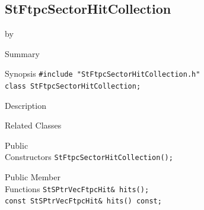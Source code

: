 \documentclass[twoside]{article}
\newcommand{\entrylabel}[1]{\mbox{\textbf{{#1}}}\hfil}%
\newenvironment{entry}
{\begin{list}{}%
    {\renewcommand{\makelabel}{\entrylabel}%
     \setlength{\labelwidth}{90pt}%
     \setlength{\leftmargin}{\labelwidth}
     \advance\leftmargin by \labelsep%
      }%
    }%
  {\end{list}}
\newcommand{\Entrylabel}[1]%
{\raisebox{0pt}[1ex][0pt]{\makebox[\labelwidth][l]%
    {\parbox[t]{\labelwidth}{\hspace{0pt}\textbf{{#1}}}}}}
\newenvironment{Entry}%
{\renewcommand{\entrylabel}{\Entrylabel}\begin{entry}}%
  {\end{entry}}
\begin{document}
\subsection{StFtpcSectorHitCollection}
\label{sec:StFtpcSectorHitCollection}
\begin{Entry}
\item[Summary]
\item[Synopsis]
    \verb+#include "StFtpcSectorHitCollection.h"+\\
    \verb+class StFtpcSectorHitCollection;+\\
\item[Description]
\item[Related Classes]
\item[Public\\ Constructors]
    \verb+StFtpcSectorHitCollection();+\\
\item[Public Member\\ Functions]
    \verb+StSPtrVecFtpcHit& hits();+\\
    
    \verb+const StSPtrVecFtpcHit& hits() const;+\\
\end{Entry}
\clearpage
\end{document}
